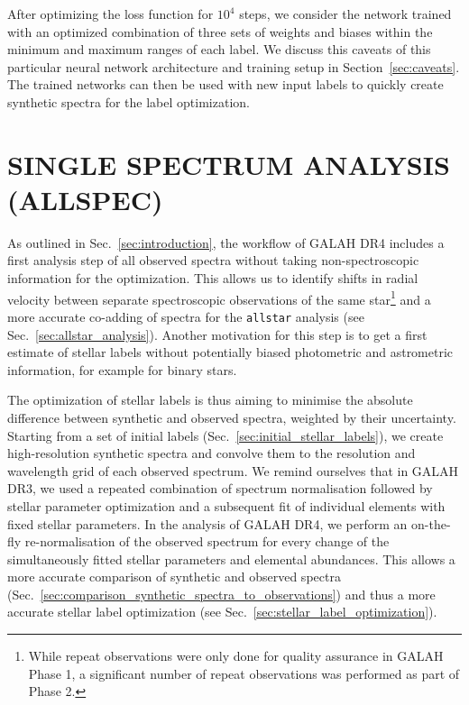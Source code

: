 \documentclass[
  journal=pasa,
  manuscript=research-paper, %
  year=2024,
  volume=37
]{cup-journal}
\begin{document}
After optimizing the loss function for $10^4$ steps, we consider the network trained with an optimized combination of three sets of weights and biases within the minimum and maximum ranges of each label. We discuss this caveats of this particular neural network architecture and training setup in Section~\ref{sec:caveats}. The trained networks can then be used with new input labels to quickly create synthetic spectra for the label optimization.

\section{SINGLE SPECTRUM ANALYSIS (ALLSPEC)}
\label{sec:allspec_analysis}

As outlined in Sec.~\ref{sec:introduction}, the workflow of GALAH DR4 includes a first analysis step of all observed spectra without taking non-spectroscopic information for the optimization. This allows us to identify shifts in radial velocity between separate spectroscopic observations of the same star\footnote{While repeat observations were only done for quality assurance in GALAH Phase 1, a significant number of repeat observations was performed as part of Phase 2.} and a more accurate co-adding of spectra for the \texttt{allstar} analysis (see Sec.~\ref{sec:allstar_analysis}). Another motivation for this step is to get a first estimate of stellar labels without potentially biased photometric and astrometric information, for example for binary stars.

The optimization of stellar labels is thus aiming to minimise the absolute difference between synthetic and observed spectra, weighted by their uncertainty. Starting from a set of initial labels (Sec.~\ref{sec:initial_stellar_labels}), we create high-resolution synthetic spectra and convolve them to the resolution and wavelength grid of each observed spectrum. We remind ourselves that in GALAH DR3, we used a repeated combination of spectrum normalisation followed by stellar parameter optimization and a subsequent fit of individual elements with fixed stellar parameters. In the analysis of GALAH DR4, we perform an on-the-fly re-normalisation of the observed spectrum for every change of the simultaneously fitted stellar parameters and elemental abundances. This allows a more accurate comparison of synthetic and observed spectra (Sec.~\ref{sec:comparison_synthetic_spectra_to_observations}) and thus a more accurate stellar label optimization (see Sec.~\ref{sec:stellar_label_optimization}).
\end{document}
